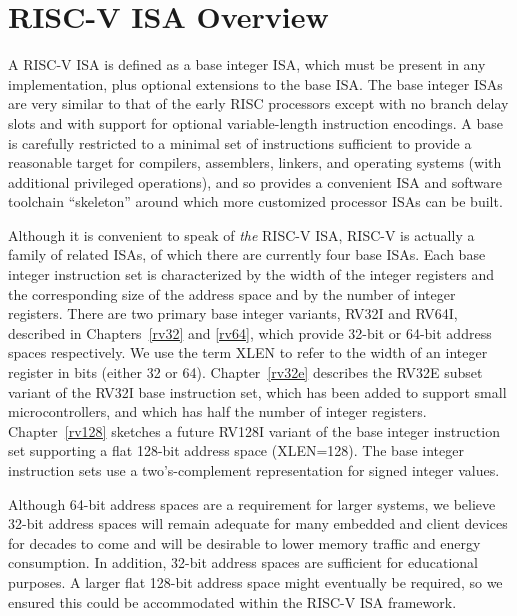 \section{RISC-V ISA Overview}

A RISC-V ISA is defined as a base integer ISA, which must be present
in any implementation, plus optional extensions to the base ISA.  The
base integer ISAs are very similar to that of the early RISC processors
except with no branch delay slots and with support for optional
variable-length instruction encodings.  A base is carefully
restricted to a minimal set of instructions sufficient to provide a
reasonable target for compilers, assemblers, linkers, and operating
systems (with additional privileged operations), and so provides
a convenient ISA and software toolchain ``skeleton'' around which more
customized processor ISAs can be built.

Although it is convenient to speak of {\em the} RISC-V ISA, RISC-V is
actually a family of related ISAs, of which there are currently four
base ISAs.  Each base integer instruction set is characterized by the
width of the integer registers and the corresponding size of the
address space and by the number of integer registers.  There are two
primary base integer variants, RV32I and RV64I, described in
Chapters~\ref{rv32} and \ref{rv64}, which provide 32-bit or 64-bit
address spaces respectively.  We use the term XLEN to refer to the
width of an integer register in bits (either 32 or 64).
Chapter~\ref{rv32e} describes the RV32E subset variant of the RV32I
base instruction set, which has been added to support small
microcontrollers, and which has half the number of integer registers.
Chapter~\ref{rv128} sketches a future RV128I variant of the base
integer instruction set supporting a flat 128-bit address space
(XLEN=128).  The base integer instruction sets use a two's-complement
representation for signed integer values.

\begin{commentary}
Although 64-bit address spaces are a requirement for larger systems,
we believe 32-bit address spaces will remain adequate for many
embedded and client devices for decades to come and will be desirable
to lower memory traffic and energy consumption.  In addition, 32-bit
address spaces are sufficient for educational purposes.  A larger flat
128-bit address space might eventually be required, so we ensured this
could be accommodated within the RISC-V ISA framework.
\end{commentary}

